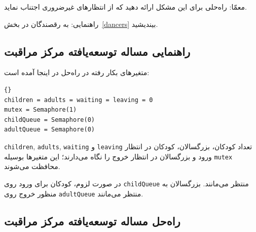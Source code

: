\documentclass{book}
\newcommand{\clearemptydoublepage}{\newpage\cleardoublepage}
\begin{document}
    معمّا: راه‌حلی برای این مشکل ارائه دهید که از انتظارهای غیرضروری اجتناب نماید. 

    راهنمایی: به رقصندگان در بخش~\ref{dancers} بیندیشید. 



\clearemptydoublepage
\subsection {راهنمایی مساله توسعه‌یافته مرکز مراقبت}

    متغیرهای بکار رفته در راه‌حل در اینجا آمده است:

\begin{latin}
\begin{lstlisting}[title=\rl{راهنمایی مساله توسعه‌یافته مرکز مراقبت}]{}
children = adults = waiting = leaving = 0
mutex = Semaphore(1)
childQueue = Semaphore(0)
adultQueue = Semaphore(0)
\end{lstlisting}
\end{latin}

{\tt children}, {\tt adults}, {\tt waiting} و {\tt leaving}
    تعداد کودکان، بزرگسالان، کودکان در انتظار ورود و بزرگسالان در انتظار خروج را نگاه می‌دارند؛ این متغیرها بوسیله {\tt mutex} محافظت می‌شوند. 

    در صورت لزوم،  کودکان  برای ورود  روی {\tt childQueue}  منتظر می‌مانند. 
    بزرگسالان به منظور خروج روی  {\tt adultQueue}  منتظر می‌مانند. 

\clearemptydoublepage
\subsection {راه‌حل مساله توسعه‌یافته مرکز مراقبت}
\end{document}
